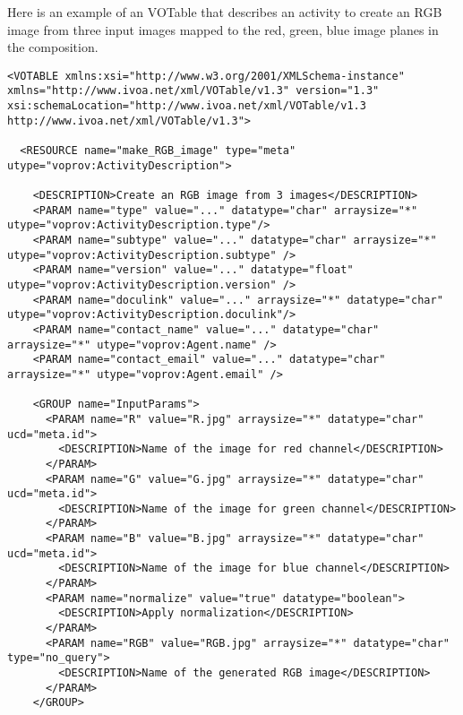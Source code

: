 Here is an example of an  VOTable that describes an activity to create an RGB image from three input images mapped to the red, green, blue image planes in the composition. 

\begin{verbatim}
<VOTABLE xmlns:xsi="http://www.w3.org/2001/XMLSchema-instance" xmlns="http://www.ivoa.net/xml/VOTable/v1.3" version="1.3" xsi:schemaLocation="http://www.ivoa.net/xml/VOTable/v1.3 http://www.ivoa.net/xml/VOTable/v1.3">
    
  <RESOURCE name="make_RGB_image" type="meta" utype="voprov:ActivityDescription">
      
    <DESCRIPTION>Create an RGB image from 3 images</DESCRIPTION>
    <PARAM name="type" value="..." datatype="char" arraysize="*" utype="voprov:ActivityDescription.type"/>
    <PARAM name="subtype" value="..." datatype="char" arraysize="*" utype="voprov:ActivityDescription.subtype" />
    <PARAM name="version" value="..." datatype="float" utype="voprov:ActivityDescription.version" />
    <PARAM name="doculink" value="..." arraysize="*" datatype="char" utype="voprov:ActivityDescription.doculink"/>
    <PARAM name="contact_name" value="..." datatype="char" arraysize="*" utype="voprov:Agent.name" />
    <PARAM name="contact_email" value="..." datatype="char" arraysize="*" utype="voprov:Agent.email" />
        
    <GROUP name="InputParams">
      <PARAM name="R" value="R.jpg" arraysize="*" datatype="char" ucd="meta.id">
        <DESCRIPTION>Name of the image for red channel</DESCRIPTION>
      </PARAM>
      <PARAM name="G" value="G.jpg" arraysize="*" datatype="char" ucd="meta.id">
        <DESCRIPTION>Name of the image for green channel</DESCRIPTION>
      </PARAM>
      <PARAM name="B" value="B.jpg" arraysize="*" datatype="char" ucd="meta.id">
        <DESCRIPTION>Name of the image for blue channel</DESCRIPTION>
      </PARAM>
      <PARAM name="normalize" value="true" datatype="boolean">
        <DESCRIPTION>Apply normalization</DESCRIPTION>
      </PARAM>
      <PARAM name="RGB" value="RGB.jpg" arraysize="*" datatype="char" type="no_query">
        <DESCRIPTION>Name of the generated RGB image</DESCRIPTION>
      </PARAM>
    </GROUP>
		

\end{verbatim}
